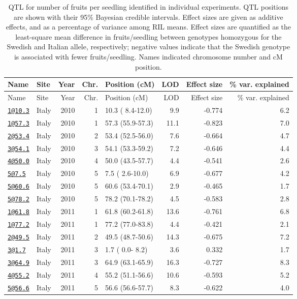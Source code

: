 \documentclass[]{article}
\begin{document}
\begin{longtable}[]{@{}llrrlrrr@{}}
\caption{\label{tab:individual-ffit-qtl}QTL for number of fruits per seedling identified in individual experiments. QTL positions are shown with their 95\% Bayesian credible intervals. Effect sizes are given as additive effects, and as a percentage of variance among RIL means. Effect sizes are quantified as the least-square mean difference in fruits/seedling between genotypes homozygous for the Swedish and Italian allele, respectively; negative values indicate that the Swedish genotype is associated with fewer fruits/seedling. Names indicated chromosome number and cM position.}\tabularnewline
\toprule
Name & Site & Year & Chr. & Position (cM) & LOD & Effect size & \% var. explained\tabularnewline
\midrule
\endfirsthead
\toprule
Name & Site & Year & Chr. & Position (cM) & LOD & Effect size & \% var. explained\tabularnewline
\midrule
\endhead
\href{mailto:1@10.3}{\nolinkurl{1@10.3}} & Italy & 2010 & 1 & 10.3 ( 8.4-12.0) & 9.9 & -0.774 & 6.2\tabularnewline
\href{mailto:1@57.3}{\nolinkurl{1@57.3}} & Italy & 2010 & 1 & 57.3 (55.9-57.3) & 11.1 & -0.823 & 7.0\tabularnewline
\href{mailto:2@53.4}{\nolinkurl{2@53.4}} & Italy & 2010 & 2 & 53.4 (52.5-56.0) & 7.6 & -0.664 & 4.7\tabularnewline
\href{mailto:3@54.1}{\nolinkurl{3@54.1}} & Italy & 2010 & 3 & 54.1 (53.3-59.2) & 7.2 & -0.646 & 4.4\tabularnewline
\href{mailto:4@50.0}{\nolinkurl{4@50.0}} & Italy & 2010 & 4 & 50.0 (43.5-57.7) & 4.4 & -0.541 & 2.6\tabularnewline
\href{mailto:5@7.5}{\nolinkurl{5@7.5}} & Italy & 2010 & 5 & 7.5 ( 2.6-10.0) & 6.9 & -0.677 & 4.2\tabularnewline
\href{mailto:5@60.6}{\nolinkurl{5@60.6}} & Italy & 2010 & 5 & 60.6 (53.4-70.1) & 2.9 & -0.465 & 1.7\tabularnewline
\href{mailto:5@78.2}{\nolinkurl{5@78.2}} & Italy & 2010 & 5 & 78.2 (70.1-78.2) & 4.5 & -0.583 & 2.8\tabularnewline
\href{mailto:1@61.8}{\nolinkurl{1@61.8}} & Italy & 2011 & 1 & 61.8 (60.2-61.8) & 13.6 & -0.761 & 6.8\tabularnewline
\href{mailto:1@77.2}{\nolinkurl{1@77.2}} & Italy & 2011 & 1 & 77.2 (77.0-83.8) & 4.4 & -0.421 & 2.1\tabularnewline
\href{mailto:2@49.5}{\nolinkurl{2@49.5}} & Italy & 2011 & 2 & 49.5 (48.7-50.6) & 14.3 & -0.675 & 7.2\tabularnewline
\href{mailto:3@1.7}{\nolinkurl{3@1.7}} & Italy & 2011 & 3 & 1.7 ( 0.0- 8.2) & 3.6 & 0.332 & 1.7\tabularnewline
\href{mailto:3@64.9}{\nolinkurl{3@64.9}} & Italy & 2011 & 3 & 64.9 (63.1-65.9) & 16.3 & -0.727 & 8.3\tabularnewline
\href{mailto:4@55.2}{\nolinkurl{4@55.2}} & Italy & 2011 & 4 & 55.2 (51.1-56.6) & 10.6 & -0.593 & 5.2\tabularnewline
\href{mailto:5@56.6}{\nolinkurl{5@56.6}} & Italy & 2011 & 5 & 56.6 (56.6-57.7) & 8.3 & -0.622 & 4.0\tabularnewline

\end{longtable}
\end{document}
